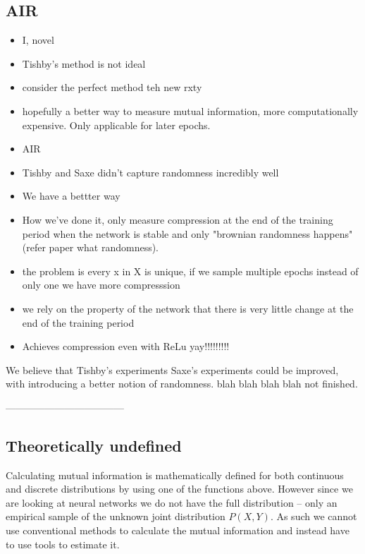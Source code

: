\documentclass[dissertation.tex]{subfiles}
\begin{document}
\subsection{AIR}

\begin{itemize}
  \item{
      I, novel
    }
  \item{
      Tishby's method is not ideal
    }
  \item{
      consider the perfect method teh new rxty
    }
  \item{
      hopefully a better way to measure mutual information, more computationally
      expensive. Only applicable for later epochs.
    }
  \item{
      AIR
    }
\end{itemize}


\begin{itemize}
  \item{
      Tishby and Saxe didn't capture randomness incredibly well 
    }
  \item{
      We have a bettter way
    }
  \item{
      How we've done it, only measure compression at the end of the training
      period when the network is stable and only "brownian randomness
      happens"(refer paper what randomness).
    }
  \item{
      the problem is every x in X is unique, if we sample multiple epochs
      instead of only one we have more compresssion
    }
  \item{
      we rely on the property of the network that there is very little change at
      the end of the training period
    }
  \item{
      Achieves compression even with ReLu yay!!!!!!!!!
    }
\end{itemize}


We believe that Tishby's experiments Saxe's experiments could be improved, with
introducing a better notion of randomness. blah blah blah blah not finished.


------------------------------------



\subsection{Theoretically undefined}

Calculating mutual information is mathematically defined for both continuous and
discrete distributions by using one of the functions above. However since we are
looking at neural networks we do not have the full distribution -- only an
empirical sample of the unknown joint distribution $ P(X,Y) $. As such we cannot
use conventional methods to calculate the mutual information and instead have to
use tools to estimate it.
\end{document}
